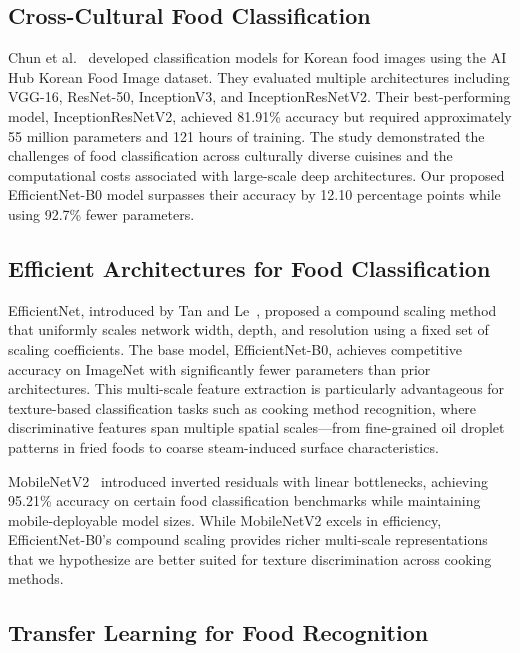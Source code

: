 \documentclass[journal]{IEEEtran}
\begin{document}
\subsection{Cross-Cultural Food Classification}

Chun et al.~\cite{chun2022korean} developed classification models for Korean food images using the AI Hub Korean Food Image dataset. They evaluated multiple architectures including VGG-16, ResNet-50, InceptionV3, and InceptionResNetV2. Their best-performing model, InceptionResNetV2, achieved 81.91\% accuracy but required approximately 55 million parameters and 121 hours of training. The study demonstrated the challenges of food classification across culturally diverse cuisines and the computational costs associated with large-scale deep architectures. Our proposed EfficientNet-B0 model surpasses their accuracy by 12.10 percentage points while using 92.7\% fewer parameters.

\subsection{Efficient Architectures for Food Classification}

EfficientNet, introduced by Tan and Le~\cite{tan2019efficientnet}, proposed a compound scaling method that uniformly scales network width, depth, and resolution using a fixed set of scaling coefficients. The base model, EfficientNet-B0, achieves competitive accuracy on ImageNet with significantly fewer parameters than prior architectures. This multi-scale feature extraction is particularly advantageous for texture-based classification tasks such as cooking method recognition, where discriminative features span multiple spatial scales---from fine-grained oil droplet patterns in fried foods to coarse steam-induced surface characteristics.

MobileNetV2~\cite{sandler2018mobilenetv2,howard2017mobilenets} introduced inverted residuals with linear bottlenecks, achieving 95.21\% accuracy on certain food classification benchmarks while maintaining mobile-deployable model sizes. While MobileNetV2 excels in efficiency, EfficientNet-B0's compound scaling provides richer multi-scale representations that we hypothesize are better suited for texture discrimination across cooking methods.

\subsection{Transfer Learning for Food Recognition}
\end{document}
